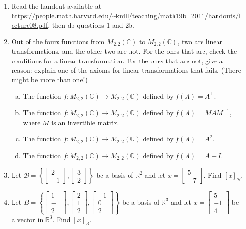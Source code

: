 \documentclass[a4paper,11pt]{article}
\theoremstyle{definition}
\begin{document}
\begin{enumerate}[(1)]
\item 
Read the handout available at \url{https://people.math.harvard.edu/~knill/teaching/math19b_2011/handouts/lecture08.pdf}, then do questions 1 and 2b.

\item 
Out of the fours functions from $M_{2,2}(\mathbb C)$ to $M_{2,2}(\mathbb C)$, two are linear transformations, and the other two are not.
For the ones that are, check the conditions for a linear transformation.
For the ones that are not, give a reason: explain one of the axioms for linear transformations that fails. (There might be more than one!)
\begin{enumerate}[(a)]
\item
The function $f:M_{2,2}(\mathbb C)\to M_{2,2}(\mathbb C)$ defined by $f(A) = A^\intercal$.
\item 
The function $f:M_{2,2}(\mathbb C)\to M_{2,2}(\mathbb C)$ defined by $f(A) = MAM^{-1}$, where $M$ is an invertible matrix.
\item 
The function $f:M_{2,2}(\mathbb C)\to M_{2,2}(\mathbb C)$ defined by $f(A) = A^2$.
\item 
The function $f:M_{2,2}(\mathbb C)\to M_{2,2}(\mathbb C)$ defined by $f(A) = A+I$.
\end{enumerate}

\item
  Let $\mathcal B = \left\{\begin{bmatrix} 2 \\ -1 \end{bmatrix},
    \begin{bmatrix} 3 \\ 2 \end{bmatrix}\right\}$ be a basis of $\mathbb R^2$  and let ${x} = \begin{bmatrix} 5 \\ -7 \end{bmatrix}$. Find $[x]_\mathcal B$.


\item
  Let $B = \left\{\begin{bmatrix} 1 \\ -1 \\ 2 \end{bmatrix},
    \begin{bmatrix} 2 \\ 1 \\ 2 \end{bmatrix},
    \begin{bmatrix} -1 \\ 0 \\ 2 \end{bmatrix}\right\}$ be a basis of $\mathbb R^3$ and let
  ${x} = \begin{bmatrix} 5 \\ -1 \\ 4 \end{bmatrix}$ be a
  vector in $\mathbb R^3$. Find $[x]_B$.



\end{enumerate}
\end{document}
